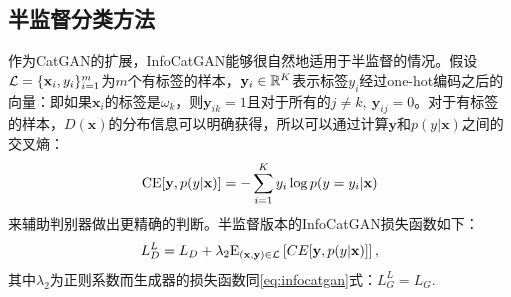 \subsection{半监督分类方法}\label{sec:ss-infocatgan}
作为CatGAN的扩展，InfoCatGAN能够很自然地适用于半监督的情况。假设$\mathcal{L} = \{\mathbf{x}_i, y_i\}_{i=1}^m$为$m$个有标签的样本，$\mathbf{y}_i \in \mathbb{R}^K$表示标签$y_i$经过one-hot编码之后的向量：即如果$\mathbf{x}_i$的标签是$\omega_k$，则$\mathbf{y}_{ik}=1$且对于所有的$j\neq k,~\mathbf{y}_{ij} = 0$。对于有标签的样本，$D(\mathbf{x})$的分布信息可以明确获得，所以可以通过计算$\mathbf{y}$和$p(y|\mathbf{x})$之间的交叉熵：
\begin{equation}
  \label{eq:celoss}
  \text{CE}[\mathbf{y}, p(y|\mathbf{x})] = -\sum_{i=1}^K y_i \log p(y=y_i | \mathbf{x})
\end{equation}
来辅助判别器做出更精确的判断。半监督版本的InfoCatGAN损失函数如下：
\begin{equation}
  \label{eq:ss-infocatgan-obj}
  L_D^L = L_D + \lambda_2 \text{E}_{(\mathbf{x}, \mathbf{y}) \in \mathcal{L}}\left[ CE[\mathbf{y}, p(y|\mathbf{x})] \right],
\end{equation}
其中$\lambda_2$为正则系数而生成器的损失函数同\eqref{eq:infocatgan}式：$L_G^L = L_G$.

